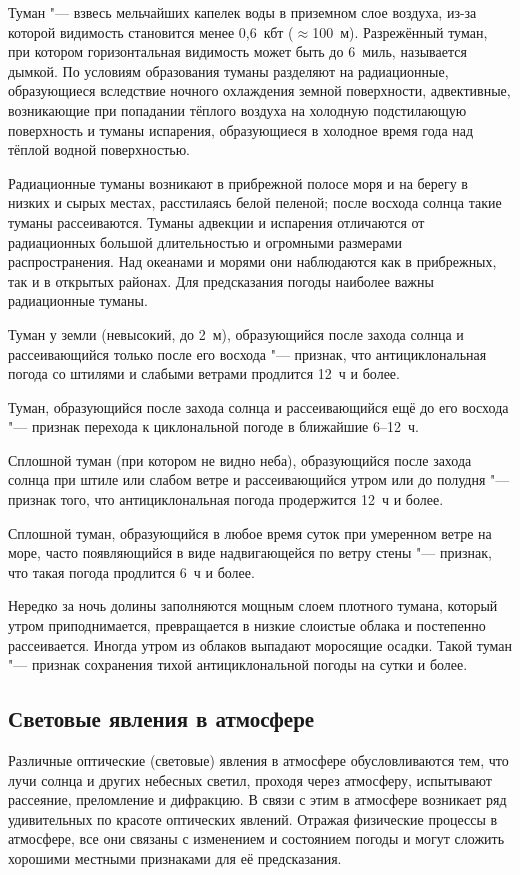 Туман "--- взвесь мельчайших капелек воды в приземном слое воздуха,
из-за которой видимость становится менее 0,6~кбт
($\approx{}$100~м). Разрежённый туман, при котором горизонтальная
видимость может быть до 6~миль, называется дымкой. По условиям
образования туманы разделяют на радиационные, образующиеся вследствие
ночного охлаждения земной поверхности, адвективные, возникающие при
попадании тёплого воздуха на холодную подстилающую поверхность и
туманы испарения, образующиеся в холодное время года над тёплой водной
поверхностью.

Радиационные туманы возникают в прибрежной полосе моря и на берегу в
низких и сырых местах, расстилаясь белой пеленой; после восхода солнца
такие туманы рассеиваются. Туманы адвекции и испарения отличаются от
радиационных большой длительностью и огромными размерами
распространения. Над океанами и морями они наблюдаются как в
прибрежных, так и в открытых районах. Для предсказания погоды наиболее
важны радиационные туманы.

 Туман у земли (невысокий, до 2~м), образующийся после захода
солнца и рассеивающийся только после его восхода "--- признак, что
антициклональная погода со штилями и слабыми ветрами продлится 12~ч и
более.

 Туман, образующийся после захода солнца и рассеивающийся ещё
до его восхода "--- признак перехода к циклональной погоде в ближайшие
6--12~ч.

 Сплошной туман (при котором не видно неба), образующийся после
захода солнца при штиле или слабом ветре и рассеивающийся утром или до
полудня "--- признак того, что антициклональная погода продержится 12~ч и
более.

 Сплошной туман, образующийся в любое время суток при умеренном
ветре на море, часто появляющийся в виде надвигающейся по ветру стены
"--- признак, что такая погода продлится 6~ч и более.

 Нередко за ночь долины заполняются мощным слоем плотного
тумана, который утром приподнимается, превращается в низкие слоистые
облака и постепенно рассеивается. Иногда утром из облаков выпадают
моросящие осадки. Такой туман "--- признак сохранения тихой
антициклональной погоды на сутки и более.

\subsection{Световые явления в атмосфере}

Различные оптические (световые) явления в атмосфере обусловливаются
тем, что лучи солнца и других небесных светил, проходя через
атмосферу, испытывают рассеяние, преломление и дифракцию. В связи с
этим в атмосфере возникает ряд удивительных по красоте оптических
явлений. Отражая физические процессы в атмосфере, все они связаны с
изменением и состоянием погоды и могут сложить хорошими местными
признаками для её предсказания.

